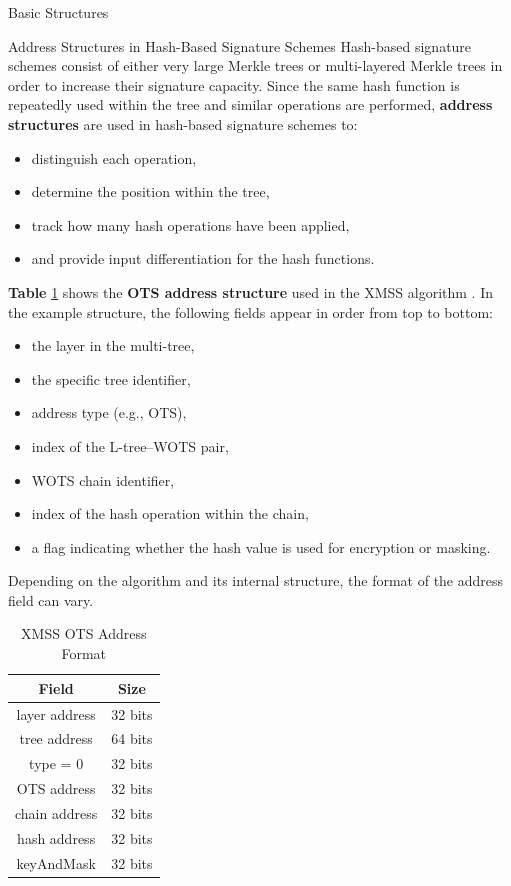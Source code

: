 \documentclass[version=preprint]{iacrcc}
\begin{document}
\begin{section}{Basic Structures}{\label{sec1}}
\begin{subsection}{Address Structures in Hash-Based Signature Schemes}
    Hash-based signature schemes consist of either very large Merkle trees or multi-layered Merkle trees in order to increase their signature capacity. Since the same hash function is repeatedly used within the tree and similar operations are performed, \textbf{address structures} are used in hash-based signature schemes to:
\begin{itemize}
    \item distinguish each operation,
    \item determine the position within the tree,
    \item track how many hash operations have been applied,
    \item and provide input differentiation for the hash functions.
\end{itemize}

\textbf{Table} \ref{tab: Adress} shows the \textbf{OTS address structure} used in the XMSS algorithm \cite{huelsing2018rfc}. In the example structure, the following fields appear in order from top to bottom:
\begin{itemize}
    \item the layer in the multi-tree,
    \item the specific tree identifier,
    \item address type (e.g., OTS),
    \item index of the L-tree–WOTS pair,
    \item WOTS chain identifier,
    \item index of the hash operation within the chain,
    \item a flag indicating whether the hash value is used for encryption or masking.
\end{itemize}

Depending on the algorithm and its internal structure, the format of the address field can vary.


\begin{table}[H]
\centering
\renewcommand{\arraystretch}{1.5}
\begin{tabular}{|c|c|}
\hline
\textbf{Field} & \textbf{Size} \\
\hline
layer address     & 32 bits \\
\hline
tree address      & 64 bits \\
\hline
type = 0          & 32 bits \\
\hline
OTS address       & 32 bits \\
\hline
chain address     & 32 bits \\
\hline
hash address      & 32 bits \\
\hline
keyAndMask        & 32 bits \\
\hline
\end{tabular}
\caption{XMSS OTS Address Format}
\label{tab: Adress}
\end{table}


\end{subsection}
\end{section}
\end{document}
